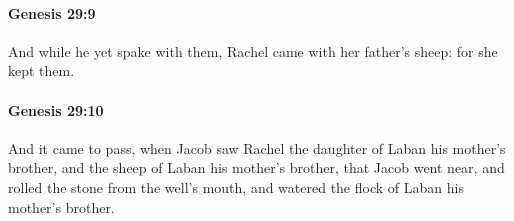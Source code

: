 		\paragraph{Genesis 29:9} %
			\label{GENESIS-29-9}

			And while he yet spake with them, Rachel came with her father's sheep: for she kept them.


		\paragraph{Genesis 29:10} %
			\label{GENESIS-29-10}

			And it came to pass, when Jacob saw Rachel the daughter of Laban his mother's brother, and the sheep of Laban his mother's brother, that Jacob went near, and rolled the stone from the well's mouth, and watered the flock of Laban his mother's brother.


